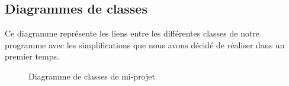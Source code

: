 \documentclass[12pt,a4paper,french]{article}
\begin{document}
\subsection{Diagrammes de classes}
Ce diagramme représente les liens entre les différentes classes de notre programme avec les simplifications que nous avons décidé de réaliser dans un premier temps.\\
\newpage
\begin{figure}[! ht ]
    \centering
    \begin{minipage}[t]{14 cm}
        \centering
        \caption {Diagramme de classes de mi-projet}
    \end{minipage}
\end{figure}
\end{document}

